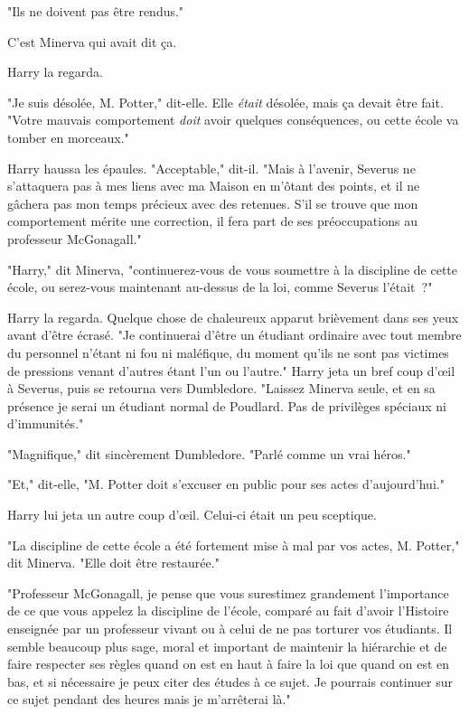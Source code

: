 "Ils ne doivent pas être rendus."

C'est Minerva qui avait dit ça.

Harry la regarda.

"Je suis désolée, M. Potter," dit-elle. Elle \emph{était} désolée, mais ça devait être fait. "Votre mauvais comportement \emph{doit} avoir quelques conséquences, ou cette école va tomber en morceaux."

Harry haussa les épaules. "Acceptable," dit-il. "Mais à l'avenir, Severus ne s'attaquera pas à mes liens avec ma Maison en m'ôtant des points, et il ne gâchera pas mon temps précieux avec des retenues. S'il se trouve que mon comportement mérite une correction, il fera part de ses préoccupations au professeur McGonagall."

"Harry," dit Minerva, "continuerez-vous de vous soumettre à la discipline de cette école, ou serez-vous maintenant au-dessus de la loi, comme Severus l'était~?"

Harry la regarda. Quelque chose de chaleureux apparut brièvement dans ses yeux avant d'être écrasé. "Je continuerai d'être un étudiant ordinaire avec tout membre du personnel n'étant ni fou ni maléfique, du moment qu'ils ne sont pas victimes de pressions venant d'autres étant l'un ou l'autre." Harry jeta un bref coup d'œil à Severus, puis se retourna vers Dumbledore. "Laissez Minerva seule, et en sa présence je serai un étudiant normal de Poudlard. Pas de privilèges spéciaux ni d'immunités."

"Magnifique," dit sincèrement Dumbledore. "Parlé comme un vrai héros."

"Et," dit-elle, "M. Potter doit s'excuser en public pour ses actes d'aujourd'hui."

Harry lui jeta un autre coup d'œil. Celui-ci était un peu sceptique.

"La discipline de cette école a été fortement mise à mal par vos actes, M. Potter," dit Minerva. "Elle doit être restaurée."

"Professeur McGonagall, je pense que vous surestimez grandement l'importance de ce que vous appelez la discipline de l'école, comparé au fait d'avoir l'Histoire enseignée par un professeur vivant ou à celui de ne pas torturer vos étudiants. Il semble beaucoup plus sage, moral et important de maintenir la hiérarchie et de faire respecter ses règles quand on est en haut à faire la loi que quand on est en bas, et si nécessaire je peux citer des études à ce sujet. Je pourrais continuer sur ce sujet pendant des heures mais je m'arrêterai là."

